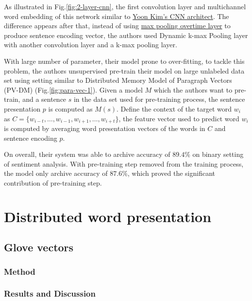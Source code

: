 As illustrated in Fig.\ref{fig:2-layer-cnn}, the first convolution layer and multichannel word embedding of this network similar to \hyperref[kim-cnn]{Yoon Kim's CNN architect}.
The difference appears after that, instead of using  \hyperref[sec:max-overtime-pooling]{max pooling overtime layer} to produce sentence encoding vector, the authors used Dynamic k-max Pooling\cite{deep-cnn-2014} layer with another convolution layer and a k-max pooling layer\cite{deep-cnn-2014}. 

With large number of parameter, their model prone to over-fitting, to tackle this problem, the authors unsupervised pre-train their model on large unlabeled data set using setting similar to Distributed Memory Model of Paragraph Vectors (PV-DM)\cite{ParagraphVec} (Fig.\ref{fig:para-vec-1}).
Given a model \(M\) which the authors want to pre-train, and a sentence \(s\) in the data set used for pre-training process, the sentence presentation \(p\) is computed as \(M(s)\). 
Define the context of the target word \(w_i\) as \(C = \{w_{i-t},\ldots,w_{i-1}, w_{i+1},\ldots,w_{i+t}\}\), the feature vector used to predict word \(w_i\) is computed by averaging word presentation vectors of the words in \(C\) and sentence encoding \(p\)\cite{2-layer-cnn}.
 
On overall, their system was able to archive accuracy of \(89.4\%\) on binary setting of sentiment analysis. 
With pre-training step removed from the training process, the model only archive accuracy of \(87.6\%\), which proved the significant contribution of pre-training step.\cite{2-layer-cnn}



\section{Distributed word presentation}\label{sec:distributed-word}

\subsection{Glove vectors}\label{sec:glove}
\subsubsection{Method}

\subsubsection{Results and Discussion}

